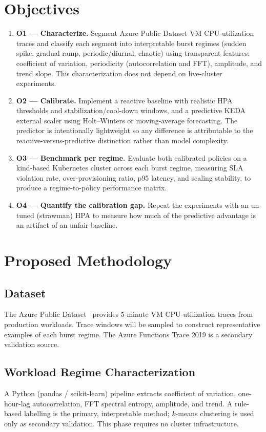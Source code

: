 \documentclass[journal]{IEEEtran}
\begin{document}
\section{Objectives}
\begin{enumerate}
\item \textbf{O1 --- Characterize.} Segment Azure Public Dataset VM CPU-utilization traces and classify each segment into interpretable burst regimes (sudden spike, gradual ramp, periodic/diurnal, chaotic) using transparent features: coefficient of variation, periodicity (autocorrelation and FFT), amplitude, and trend slope. This characterization does not depend on live-cluster experiments.
\item \textbf{O2 --- Calibrate.} Implement a reactive baseline with realistic HPA thresholds and stabilization/cool-down windows, and a predictive KEDA external scaler using Holt--Winters or moving-average forecasting. The predictor is intentionally lightweight so any difference is attributable to the reactive-versus-predictive distinction rather than model complexity.
\item \textbf{O3 --- Benchmark per regime.} Evaluate both calibrated policies on a kind-based Kubernetes cluster across each burst regime, measuring SLA violation rate, over-provisioning ratio, p95 latency, and scaling stability, to produce a regime-to-policy performance matrix.
\item \textbf{O4 --- Quantify the calibration gap.} Repeat the experiments with an un-tuned (strawman) HPA to measure how much of the predictive advantage is an artifact of an unfair baseline.
\end{enumerate}

\section{Proposed Methodology}

\subsection{Dataset}
The Azure Public Dataset~\cite{cortez2017,azuredataset} provides 5-minute VM CPU-utilization traces from production workloads. Trace windows will be sampled to construct representative examples of each burst regime. The Azure Functions Trace 2019 is a secondary validation source.

\subsection{Workload Regime Characterization}
A Python (pandas / scikit-learn) pipeline extracts coefficient of variation, one-hour-lag autocorrelation, FFT spectral entropy, amplitude, and trend. A rule-based labelling is the primary, interpretable method; $k$-means clustering is used only as secondary validation. This phase requires no cluster infrastructure.
\end{document}

